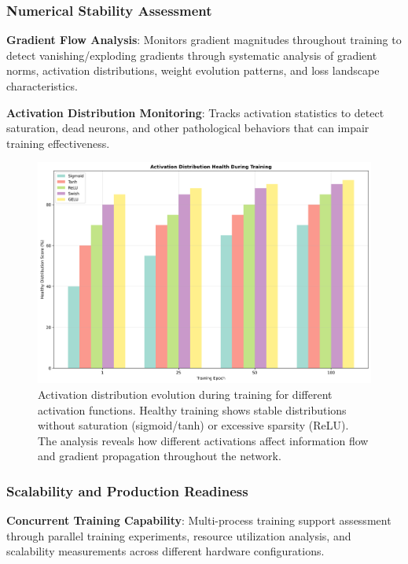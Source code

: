 \documentclass[11pt,a4paper]{report}
\begin{document}
\subsubsection{Numerical Stability Assessment}

\textbf{Gradient Flow Analysis}: Monitors gradient magnitudes throughout training to detect vanishing/exploding gradients through systematic analysis of gradient norms, activation distributions, weight evolution patterns, and loss landscape characteristics.

\textbf{Activation Distribution Monitoring}: Tracks activation statistics to detect saturation, dead neurons, and other pathological behaviors that can impair training effectiveness.

\begin{figure}[H]
\centering
\includegraphics[width=\textwidth]{performance_activation_distributions.png}
\caption{Activation distribution evolution during training for different activation functions. Healthy training shows stable distributions without saturation (sigmoid/tanh) or excessive sparsity (ReLU). The analysis reveals how different activations affect information flow and gradient propagation throughout the network.}
\label{fig:activation_distributions}
\end{figure}

\subsubsection{Scalability and Production Readiness}

\textbf{Concurrent Training Capability}: Multi-process training support assessment through parallel training experiments, resource utilization analysis, and scalability measurements across different hardware configurations.
\end{document}
